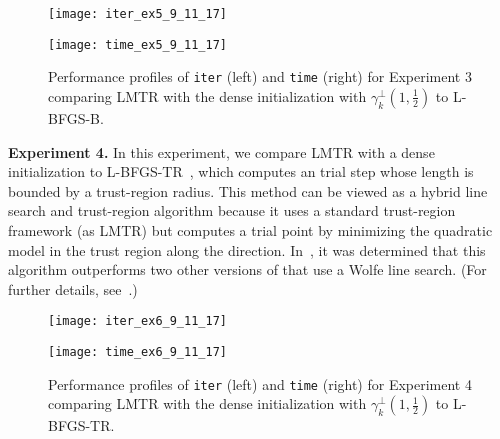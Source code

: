   \begin{figure*}[h!]
                        \begin{minipage}{0.48\textwidth}
                                \texttt{[image: iter\_ex5\_9\_11\_17]}
                                
                        \end{minipage}
                        \hfill
                        \begin{minipage}{0.48\textwidth}
                                                \texttt{[image: time\_ex5\_9\_11\_17]}
                                                
                        \end{minipage}
                        \caption{Performance profiles of 
                        \texttt{iter} (left) and
\texttt{time} (right) for Experiment 3 comparing LMTR with the dense initialization
with
$\gamma_k^{\perp}(1,\frac{1}{2})$
 to {\small L-BFGS-B}.}
                \label{fig:exp5}       
                \end{figure*}




\bigskip
\noindent
{\bf Experiment 4.} In this experiment, we compare {\small LMTR} with
a dense initialization to {\small L-BFGS-TR}~\cite{BurdakovLMTR16},
which computes 
an \LBFGS{} trial step whose length is bounded by a
trust-region radius.  This method can be viewed as a hybrid \LBFGS{}
line search and trust-region algorithm 
because it uses a standard trust-region framework (as {\small LMTR}) but computes
a trial point by minimizing the quadratic model in the trust region
along the \LBFGS{} direction.
In~\cite{BurdakovLMTR16}, it was determined that this algorithm
outperforms two other versions of \LBFGS{} that use a Wolfe line search.
(For further details, see~\cite{BurdakovLMTR16}.)

  \begin{figure*}[h!]
                        \begin{minipage}{0.48\textwidth}
                                \texttt{[image: iter\_ex6\_9\_11\_17]}
                                
                        \end{minipage}
                        \hfill
                        \begin{minipage}{0.48\textwidth}
                                                \texttt{[image: time\_ex6\_9\_11\_17]}
                                
                        \end{minipage}
                        \caption{Performance profiles of 
                        \texttt{iter} (left) and
\texttt{time} (right) for Experiment 4
                        comparing  LMTR with the dense initialization
with 
$\gamma_k^{\perp}(1,\frac{1}{2})$
 to L-BFGS-TR.}
     
                \label{fig:exp6}       
                \end{figure*}
                
